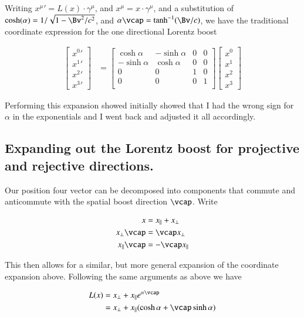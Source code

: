 \documentclass{article}
\begin{document}
Writing ${x^\mu}' = L(x) \cdot \gamma^\mu$, and $x^\mu = x \cdot \gamma^\mu$,
and a substitution of $\cosh(\alpha) = 1/\sqrt{1 - \Bv^2/c^2}$, and $\alpha \vcap = \tanh^{-1}(\Bv/c)$,
we have the traditional coordinate
expression for the one directional Lorentz boost

\begin{align}
\begin{bmatrix}
{x^0}' \\
{x^1}' \\
{x^2}' \\
{x^3}'
\end{bmatrix}
&=
\begin{bmatrix}
\cosh\alpha & -\sinh\alpha & 0 & 0 \\
-\sinh\alpha & \cosh\alpha & 0 & 0 \\
0 & 0 & 1 & 0 \\
0 & 0 & 0 & 1 \\
\end{bmatrix}
\begin{bmatrix}
x^0 \\
x^1 \\
x^2 \\
x^3
\end{bmatrix}
\end{align}

Performing this expansion showed initially showed that I had the wrong sign for $\alpha$ in the exponentials and I went back and
adjusted it all accordingly.

\subsection{ Expanding out the Lorentz boost for projective and rejective directions. }

Our position four vector can be decomposed into components that commute and anticommute with the spatial boost direction
$\vcap$.  Write

\begin{align*}
x &= x_\parallel + x_\perp \\
x_\perp \vcap &= \vcap x_\perp \\
x_\parallel \vcap &= -\vcap x_\parallel
\end{align*}

This then allows for a similar, but more general expansion of the coordinate expansion above.  Following the same arguments
as above we have

\begin{align*}
L(x) 
&= x_\perp + x_\parallel e^{\alpha \vcap} \\
&= x_\perp + x_\parallel (\cosh\alpha + \vcap\sinh\alpha) \\
\end{align*}
\end{document}
